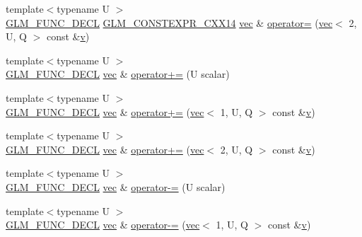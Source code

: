 \begin{DoxyCompactItemize}
\item 
{\footnotesize template$<$typename U $>$ }\\\hyperlink{setup_8hpp_ab2d052de21a70539923e9bcbf6e83a51}{G\+L\+M\+\_\+\+F\+U\+N\+C\+\_\+\+D\+E\+CL} \hyperlink{setup_8hpp_a4dd12abf5e1164bc57f3a34671d03844}{G\+L\+M\+\_\+\+C\+O\+N\+S\+T\+E\+X\+P\+R\+\_\+\+C\+X\+X14} \hyperlink{structglm_1_1vec}{vec} \& \hyperlink{structglm_1_1vec_3_012_00_01_t_00_01_q_01_4_a816f1cde5e8bbb6425dd5a93b8579763}{operator=} (\hyperlink{structglm_1_1vec}{vec}$<$ 2, U, Q $>$ const \&\hyperlink{_s_d_l__opengl_8h_a10a82eabcb59d2fcd74acee063775f90}{v})
\item 
{\footnotesize template$<$typename U $>$ }\\\hyperlink{setup_8hpp_ab2d052de21a70539923e9bcbf6e83a51}{G\+L\+M\+\_\+\+F\+U\+N\+C\+\_\+\+D\+E\+CL} \hyperlink{structglm_1_1vec}{vec} \& \hyperlink{structglm_1_1vec_3_012_00_01_t_00_01_q_01_4_a7c1fa9f2692a42abc2cef20f639f7adf}{operator+=} (U scalar)
\item 
{\footnotesize template$<$typename U $>$ }\\\hyperlink{setup_8hpp_ab2d052de21a70539923e9bcbf6e83a51}{G\+L\+M\+\_\+\+F\+U\+N\+C\+\_\+\+D\+E\+CL} \hyperlink{structglm_1_1vec}{vec} \& \hyperlink{structglm_1_1vec_3_012_00_01_t_00_01_q_01_4_a1c157e104fcc32dba87fcd6a47457523}{operator+=} (\hyperlink{structglm_1_1vec}{vec}$<$ 1, U, Q $>$ const \&\hyperlink{_s_d_l__opengl_8h_a10a82eabcb59d2fcd74acee063775f90}{v})
\item 
{\footnotesize template$<$typename U $>$ }\\\hyperlink{setup_8hpp_ab2d052de21a70539923e9bcbf6e83a51}{G\+L\+M\+\_\+\+F\+U\+N\+C\+\_\+\+D\+E\+CL} \hyperlink{structglm_1_1vec}{vec} \& \hyperlink{structglm_1_1vec_3_012_00_01_t_00_01_q_01_4_aca945ef129a7730690a1b216b5aa67b0}{operator+=} (\hyperlink{structglm_1_1vec}{vec}$<$ 2, U, Q $>$ const \&\hyperlink{_s_d_l__opengl_8h_a10a82eabcb59d2fcd74acee063775f90}{v})
\item 
{\footnotesize template$<$typename U $>$ }\\\hyperlink{setup_8hpp_ab2d052de21a70539923e9bcbf6e83a51}{G\+L\+M\+\_\+\+F\+U\+N\+C\+\_\+\+D\+E\+CL} \hyperlink{structglm_1_1vec}{vec} \& \hyperlink{structglm_1_1vec_3_012_00_01_t_00_01_q_01_4_a6961040865246e7250dd6cf13956d09e}{operator-\/=} (U scalar)
\item 
{\footnotesize template$<$typename U $>$ }\\\hyperlink{setup_8hpp_ab2d052de21a70539923e9bcbf6e83a51}{G\+L\+M\+\_\+\+F\+U\+N\+C\+\_\+\+D\+E\+CL} \hyperlink{structglm_1_1vec}{vec} \& \hyperlink{structglm_1_1vec_3_012_00_01_t_00_01_q_01_4_ad0145e78e71199aad6aa61d5e899f1eb}{operator-\/=} (\hyperlink{structglm_1_1vec}{vec}$<$ 1, U, Q $>$ const \&\hyperlink{_s_d_l__opengl_8h_a10a82eabcb59d2fcd74acee063775f90}{v})

\end{DoxyCompactItemize}

